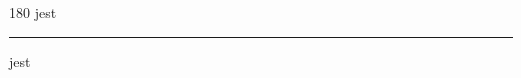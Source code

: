 
\begin{frame}
\begin{center}
\begin{turn}{180}
{\fontsize{2.5cm}{1em}\selectfont jest}
\end{turn}
\vspace{1em}\par  
\hrule
\vspace{1em}\par  
{\fontsize{2.5cm}{1em}\selectfont jest}
\end{center}
\end{frame}
